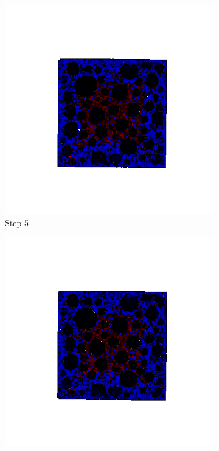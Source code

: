 \begin{figure}[ht!]
      \begin{subfigure}{.25\textwidth}
        \centering
        \includegraphics[width=1.0\linewidth]{Files/A30X0C_3_IS/DEP50-STEP(005).png}
      \caption{Step 5}
      \end{subfigure}%
      \begin{subfigure}{.25\textwidth}
        \centering
        \includegraphics[width=1.0\linewidth]{Files/A30X0C_3_IS/DEP50-STEP(006).png}

\end{subfigure}
\end{figure}
